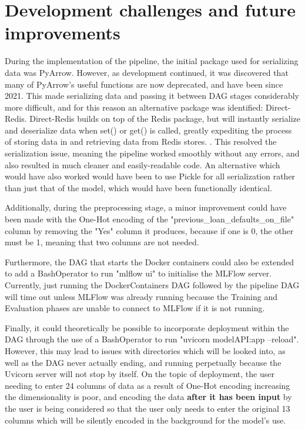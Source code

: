 \documentclass[12pt]{report}
\newcommand{\para}{\vspace{7pt}\noindent}
\begin{document}
\section{Development challenges and future improvements}
During the implementation of the pipeline, the initial package used for serializing data was PyArrow.
However, as development continued, it was discovered that many of PyArrow's useful functions are now 
deprecated, and have been since 2021. This made serializing data and passing it between DAG stages considerably more difficult, 
and for this reason an alternative package was identified: Direct-Redis. Direct-Redis builds on top of the Redis 
package, but will instantly serialize and deserialize data when set() or get() is called, greatly expediting 
the process of storing data in and retrieving data from Redis stores. \autocite{direct-redis_direct-redis_nodate}.
This resolved the serialization issue, meaning the pipeline worked smoothly without any errors, and also 
resulted in much cleaner and easily-readable code. An alternative which would have also worked would have been to 
use Pickle for all serialization rather than just that of the model, which would have been functionally identical.

\para Additionally, during the preprocessing stage, a minor improvement could have been made with the One-Hot 
encoding of the "previous\_loan\_defaults\_on\_file" column by removing the "Yes" column it produces, because 
if one is 0, the other must be 1, meaning that two columns are not needed.

\para Furthermore, the DAG that starts the Docker containers could also be extended to add a BashOperator to run 
"mlflow ui" to initialise the MLFlow server. Currently, just running the DockerContainers DAG followed by the pipeline DAG will 
time out unless MLFlow was already running because the Training and Evaluation phases are unable to connect to MLFlow 
if it is not running.

\para Finally, it could theoretically be possible to incorporate deployment within the DAG through the use of a 
BashOperator to run "uvicorn modelAPI:app --reload". However, this may lead to issues with directories which will be 
looked into, as well as the DAG never actually ending, and running perpetually because the Uvicorn server will not stop 
by itself. On the topic of deployment, the user needing to enter 24 columns of data as a result of One-Hot encoding 
increasing the dimensionality is poor, and encoding the data \textbf{after it has been input} by the user is being considered so 
that the user only needs to enter the original 13 columns which will be silently encoded in the background for the model's use.
\end{document}
